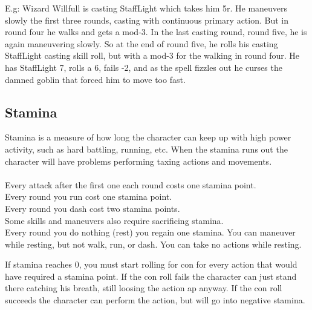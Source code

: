 E.g: Wizard Willfull is casting StaffLight which takes him 5r. He maneuvers slowly the first three rounds, casting with continuous primary action. But in round four he walks and gets a mod-3. In the last casting round, round five, he is again maneuvering slowly. So at the end of round five, he rolls his casting StaffLight casting skill roll, but with a mod-3 for the walking in round four. He has StaffLight 7, rolls a 6, fails -2, and as the spell fizzles out he curses the damned goblin that forced him to move too fast.
















\subsection*{Stamina}
Stamina is a measure of how long the character can keep up with high power activity, such as hard battling, running, etc. When the stamina runs out the character will have problems performing taxing actions and movements. \\
\\
Every attack after the first one each round costs one stamina point. \\
Every round you run cost one stamina point. \\
Every round you dash cost two stamina points. \\
Some skills and maneuvers also require sacrificing stamina. \\
Every round you do nothing (rest) you regain one stamina. You can maneuver while resting, but not walk, run, or dash. You can take no actions while resting.

If stamina reaches 0, you must start rolling for con for every action that would have required a stamina point. If the con roll fails the character can just stand there catching his breath, still loosing the action ap anyway. If the con roll succeeds the character can perform the action, but will go into negative stamina.

